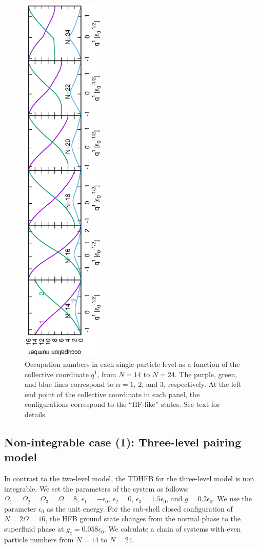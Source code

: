 \documentclass[%
superscriptaddress,
showpacs,
nofootinbib,
amsmath,amssymb,
aps,
prc,
twocolumn,
floatfix ]%
{revtex4-1}
\begin{document}
\begin{figure}[tb]
 \begin{center}
  \includegraphics[width=40mm,angle=-90]{occ_number.eps}
 \end{center}
\caption{Occupation numbers in each single-particle level
as a function of the collective coordinate $q^1$,
from $N=14$ to $N=24$.
The purple, green, and blue lines correspond to
$\alpha=1$, 2, and 3, respectively.
At the left end point of the collective coordinate in each panel,
the configurations correspond to the ``HF-like'' states.
See text for details.
}
 \label{occ_number}
\end{figure}
\subsection{Non-integrable case (1): Three-level pairing model}
\label{sec:three-level-model}

In contrast to the two-level model,
the TDHFB for the three-level model is non integrable.
We set the parameters of the system as follows:
$\Omega_1=\Omega_2=\Omega_3=\Omega=8$,
$\epsilon_1=-\epsilon_0$, $\epsilon_2=0$, $\epsilon_3=1.5\epsilon_0$,
and $g=0.2\epsilon_0$.
We use the parameter $\epsilon_0$ as the unit energy.
For the sub-shell closed configuration of $N=2\Omega=16$,
the HFB ground state changes from the normal phase to
the superfluid phase at $g_c=0.058\epsilon_0$.
We calculate a chain of systems with even particle numbers
from $N=14$ to $N=24$. 
\end{document}
